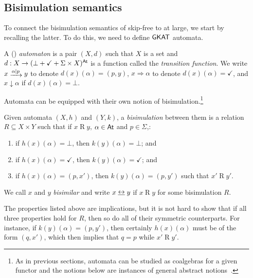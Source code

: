 \documentclass[orivec,envcountsect,envcountsame]{llncs}
\begin{document}
\subsection{Bisimulation semantics}

To connect the bisimulation semantics of skip-free \GKAT to \GKAT at large, we start by recalling the latter.
To do this, we need to define $\textsf{GKAT}$ automata.

\begin{definition}
A (\GKAT) \emph{automaton} is a pair $(X, d)$ such that $X$ is a set and $d: X \to (\bot + \checkmark + \Sigma \times X)^{\mathsf{At}}$ is a function called the \emph{transition function}.
We write \(x \tr{\alpha\mid p} y\) to denote \(d(x)(\alpha) = (p, y)\), \(x \Rightarrow \alpha\) to denote \(d(x)(\alpha) = \checkmark\), and \(x\downarrow\alpha\) if \(d(x)(\alpha) = \bot\).
\end{definition}

Automata can be equipped with their own notion of bisimulation.\footnote{As in previous sections, automata can be studied as coalgebras for a given functor and the notions below are instances of general abstract notions~\cite{gumm,coalgebra}.}

\begin{definition}
Given automata $(X, h)$ and $(Y, k)$, a \emph{bisimulation} between them is a relation $R \subseteq X \times Y$ such that if $x \mathrel{R} y$, $\alpha \in \mathsf{At}$ and $p \in \Sigma$,:
\begin{enumerate}
    \item
    if $h(x)(\alpha) = \bot$, then $k(y)(\alpha) = \bot$; and
    \item
    if $h(x)(\alpha) = \checkmark$, then $k(y)(\alpha) = \checkmark$; and
    \item
    if $h(x)(\alpha) = (p, x')$, then $k(y)(\alpha) = (p, y')$ such that $x' \mathrel{R} y'$.
\end{enumerate}
We call $x$ and \(y\) \emph{bisimilar} and write \(x \bisim y\) if \(x \mathrel{R} y\) for some bisimulation \(R\).%
\end{definition}

\begin{remark}
The properties listed above are implications, but it is not hard to show that if all three properties hold for $R$, then so do all of their symmetric counterparts.
For instance, if $k(y)(\alpha) = (p, y')$, then certainly $h(x)(\alpha)$ must be of the form $(q, x')$, which then implies that $q = p$ while $x' \mathrel{R} y'$.
\end{remark}
\end{document}
